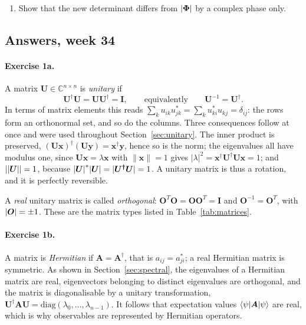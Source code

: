 \begin{enumerate}
  \item[c)] Show that the new determinant differs from ${|\boldsymbol{\Phi}|}$ by a
  complex phase only.
\end{enumerate}

\subsection*{Answers, week 34}

\paragraph{Exercise 1a.}
A matrix $\bm{U}\in\mathbb{C}^{n\times n}$ is \emph{unitary} if
\begin{equation}
  \bm{U}^{\dagger}\bm{U} = \bm{U}\bm{U}^{\dagger} = \bm{I},
  \qquad\text{equivalently}\qquad
  \bm{U}^{-1} = \bm{U}^{\dagger} .
  \label{eq:1-w34a1}
\end{equation}
In terms of matrix elements this reads $\sum_k u_{ik}u_{jk}^{*}=\sum_k
u_{ki}^{*}u_{kj}=\delta_{ij}$: the rows form an orthonormal set, and so do the
columns.  Three consequences follow at once and were used throughout
Section~\ref{sec:unitary}.  The inner product is preserved,
$(\bm{U}\bm{x})^{\dagger}(\bm{U}\bm{y})=\bm{x}^{\dagger}\bm{y}$, hence so is
the norm; the eigenvalues all have modulus one, since
$\bm{U}\bm{x}=\lambda\bm{x}$ with $\|\bm{x}\|=1$ gives
$|\lambda|^2=\bm{x}^{\dagger}\bm{U}^{\dagger}\bm{U}\bm{x}=1$; and
$|{|\boldsymbol{U}|}|=1$, because ${|\boldsymbol{U}|}^{*}{|\boldsymbol{U}|}={|\boldsymbol{U^{\dagger}U}|}=1$.  A unitary
matrix is thus a rotation, and it is perfectly reversible.

A \emph{real} unitary matrix is called \emph{orthogonal}: $\bm{O}^{T}\bm{O}=
\bm{O}\bm{O}^{T}=\bm{I}$ and $\bm{O}^{-1}=\bm{O}^{T}$, with
${|\boldsymbol{O}|}=\pm1$.  These are the matrix types listed in
Table~\ref{tab:matrices}.

\paragraph{Exercise 1b.}
A matrix is \emph{Hermitian} if $\bm{A}=\bm{A}^{\dagger}$, that is
$a_{ij}=a_{ji}^{*}$; a real Hermitian matrix is symmetric.  As shown in
Section~\ref{sec:spectral}, the eigenvalues of a Hermitian matrix are real,
eigenvectors belonging to distinct eigenvalues are orthogonal, and the matrix
is diagonalisable by a unitary transformation,
$\bm{U}^{\dagger}\bm{A}\bm{U}=\mathrm{diag}(\lambda_0,\dots,\lambda_{n-1})$.
It follows that expectation values $\langle \psi | \bm{A} | \psi \rangle$ are real,
which is why observables are represented by Hermitian operators.

